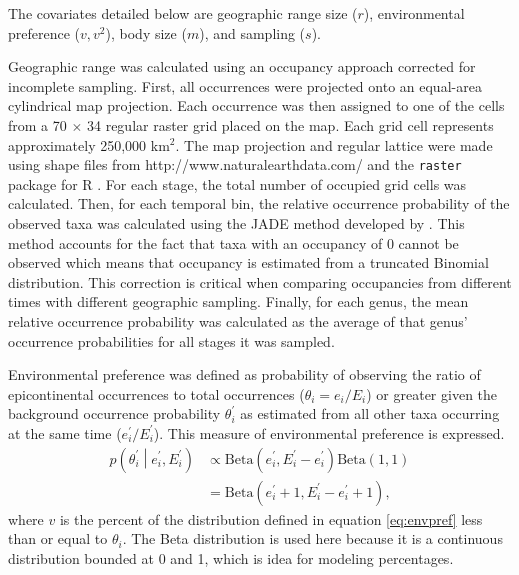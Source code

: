 \documentclass{article}
\begin{document}
The covariates detailed below are geographic range size (\(r\)), environmental preference (\(v, v^{2}\)), body size (\(m\)), and sampling (\(s\)).

Geographic range was calculated using an occupancy approach corrected for incomplete sampling. First, all occurrences were projected onto an equal-area cylindrical map projection. Each occurrence was then assigned to one of the cells from a 70 \(\times\) 34 regular raster grid placed on the map. Each grid cell represents approximately 250,000 km\(^{2}\). The map projection and regular lattice were made using shape files from http://www.naturalearthdata.com/ and the \texttt{raster} package for R \citep{raster}. For each stage, the total number of occupied grid cells was calculated. Then, for each temporal bin, the relative occurrence probability of the observed taxa was calculated using the \uppercase{jade} method developed by \citet{Chao2015a}. This method accounts for the fact that taxa with an occupancy of 0 cannot be observed which means that occupancy is estimated from a truncated Binomial distribution. This correction is critical when comparing occupancies from different times with different geographic sampling. Finally, for each genus, the mean relative occurrence probability was calculated as the average of that genus' occurrence probabilities for all stages it was sampled.

Environmental preference was defined as probability of observing the ratio of epicontinental occurrences to total occurrences (\(\theta_{i} = e_{i} / E_{i}\)) or greater given the background occurrence probability \(\theta^{\prime}_{i}\) as estimated from all other taxa occurring at the same time (\(e^{\prime}_{i} / E^{\prime}_{i}\)). This measure of environmental preference is expressed.
\begin{equation*}
  \begin{aligned}
    p\left(\theta^{\prime}_{i} \middle| e^{\prime}_{i}, E^{\prime}_{i} \right) &\propto \mathrm{Beta}(e^{\prime}_{i}, E^{\prime}_{i} - e^{\prime}_{i}) \mathrm{Beta}(1, 1) \\
    &= \mathrm{Beta}(e^{\prime}_{i} + 1, E^{\prime}_{i} - e^{\prime}_{i} + 1),
  \end{aligned}
  \label{eq:envpref}
\end{equation*}
where \(v\) is the percent of the distribution defined in equation \ref{eq:envpref} less than or equal to \(\theta_{i}\). The Beta distribution is used here because it is a continuous distribution bounded at 0 and 1, which is idea for modeling percentages.
\end{document}
